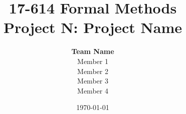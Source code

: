 \documentclass[titlepage]{article}
\begin{document}
\title{17-614 Formal Methods\\[1ex] Project N: Project Name}
\author{
{\Large\textbf{Team Name}}\\[3ex]
Member 1\\[1ex] Member 2\\[1ex] Member 3\\[1ex] Member 4}
\date{\today}
\maketitle
\end{document}
